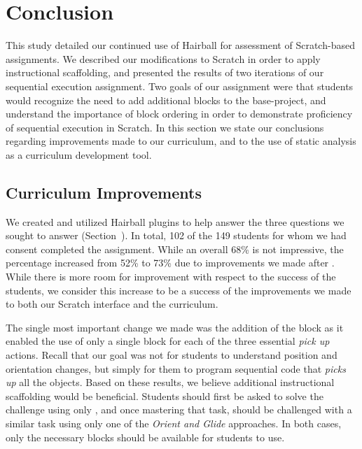 \section{Conclusion} 
This study detailed our continued use of Hairball for assessment of
Scratch-based assignments. We described our modifications to Scratch in order
to apply instructional scaffolding, and presented the results of two iterations
of our sequential execution assignment. Two goals of our assignment were that
students would recognize the need to add additional blocks to the base-project,
and understand the importance of block ordering in order to demonstrate
proficiency of sequential execution in Scratch. In this section we state our
conclusions regarding improvements made to our curriculum, and to the use of
static analysis as a curriculum development tool.

\subsection{Curriculum Improvements}
We created and utilized Hairball plugins to help answer the three questions we
sought to answer (Section~). In total, 102 of the 149
students for whom we had consent completed the assignment. While an overall
68\% is not impressive, the percentage increased from 52\% to 73\% due to
improvements we made after \sone{}. While there is more room for improvement
with respect to the success of the students, we consider this increase to be a
success of the improvements we made to both our Scratch interface and the
curriculum.

The single most important change we made was the addition of the \glideto{}
block as it enabled the use of only a single block for each of the three
essential \emph{pick up} actions. Recall that our goal was not for students to
understand position and orientation changes, but simply for them to program
sequential code that \emph{picks up} all the objects. Based on these results,
we believe additional instructional scaffolding would be beneficial. Students
should first be asked to solve the challenge using only \glideto{}, and once
mastering that task, should be challenged with a similar task using only one of
the \emph{Orient and Glide} approaches. In both cases, only the necessary
blocks should be available for students to use.

